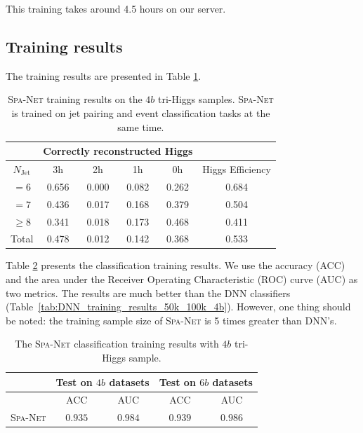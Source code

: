 \documentclass[12pt]{article}
\begin{document}
		This training takes around 4.5 hours on our server.
	\subsection{Training results}%
	\label{sub:training_results_spanet_classifier}
		The training results are presented in Table \ref{tab:SPANet_triHiggs_4b_cls_pairing_results}.

		\begin{table}[htpb]
			\centering
			\caption{\textsc{Spa-Net} training results on the $4b$ tri-Higgs samples. \textsc{Spa-Net} is trained on jet pairing and event classification tasks at the same time.}
			\label{tab:SPANet_triHiggs_4b_cls_pairing_results}
			\begin{tabular}{c|cccc|c}
			               & \multicolumn{4}{c|}{Correctly reconstructed Higgs} &                  \\ \hline
			$N_\text{Jet}$ & 3h          & 2h         & 1h         & 0h         & Higgs Efficiency \\ \hline
			$=6$           & 0.656       & 0.000      & 0.082      & 0.262      & 0.684            \\
			$=7$           & 0.436       & 0.017      & 0.168      & 0.379      & 0.504            \\
			$\ge 8$        & 0.341       & 0.018      & 0.173      & 0.468      & 0.411            \\ \hline
			Total          & 0.478       & 0.012      & 0.142      & 0.368      & 0.533            
			\end{tabular}
			
		\end{table}

        Table \ref{tab:SPANet_triHiggs_4b_cls_classification_results} presents the classification training results. We use the accuracy (ACC) and the area under the Receiver Operating Characteristic (ROC) curve (AUC) as two metrics. The results are much better than the DNN classifiers (Table~\ref{tab:DNN_training_results_50k_100k_4b}). However, one thing should be noted: the training sample size of \textsc{Spa-Net} is 5 times greater than DNN's.
		\begin{table}[htpb]
			\centering
			\caption{The \textsc{Spa-Net} classification training results with $4b$ tri-Higgs sample.}
			\label{tab:SPANet_triHiggs_4b_cls_classification_results}
			\begin{tabular}{c|cc|cc}
				             & \multicolumn{2}{c|}{Test on $4b$ datasets}& \multicolumn{2}{c}{Test on $6b$ datasets} \\ \hline
                             & ACC                 & AUC                 & ACC                 & AUC                 \\ \hline
			\textsc{Spa-Net} & $0.935$             & $0.984$             & $0.939$             & $0.986$            
            \end{tabular}    
		\end{table}
\end{document}
